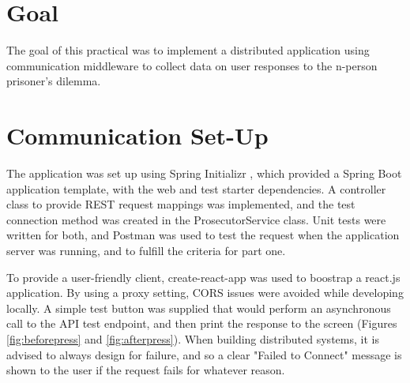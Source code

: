 \documentclass[12pt]{article}
\begin{document}
\part*{Goal}

The goal of this practical was to implement a distributed application using communication middleware to collect data on user responses to the n-person prisoner's dilemma.

\part{Communication Set-Up}

The application was set up using Spring Initializr \cite{springinit}, which provided a Spring Boot application template, with the web and test starter dependencies. A controller class to provide REST request mappings was implemented, and the test connection method was created in the ProsecutorService class. Unit tests were written for both, and Postman was used to test the request when the application server was running, and to fulfill the criteria for part one.

To provide a user-friendly client, create-react-app \cite{createreactapp} was used to boostrap a react.js application. By using a proxy setting, CORS issues were avoided while developing locally. A simple test button was supplied that would perform an asynchronous call to the API test endpoint, and then print the response to the screen (Figures \ref{fig:beforepress} and \ref{fig:afterpress}). When building distributed systems, it is advised to always design for failure, and so a clear "Failed to Connect" message is shown to the user if the request fails for whatever reason.
\end{document}
